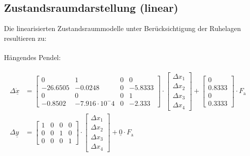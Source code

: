 \subsection{Zustandsraumdarstellung (linear)}

Die linearisierten Zustandsraummodelle unter Berücksichtigung der Ruhelagen resultieren zu:\\\\
Hängendes Pendel:

\begin{align}\label{eq:Gleichung32}
    \begin{split}
        \Delta{\dot{\underline{x}}}&=
        \begin{bmatrix}
            0 & 1 & 0 & 0 \\
            -26.6505 & -0.0248 & 0 & -5.8333 \\
            0 & 0 & 0 & 1 \\
            -0.8502 & -7.916\cdot10^-4 & 0 & -2.333
        \end{bmatrix}\cdot
        \begin{bmatrix}
            \Delta{x_{\mathrm{1}}} \\ \Delta{x_{\mathrm{2}}} \\ \Delta{x_{\mathrm{3}}} \\ \Delta{x_{\mathrm{4}}}
        \end{bmatrix}+
        \begin{bmatrix}
            0 \\
            0.8333 \\
            0 \\
            0.3333
        \end{bmatrix}\cdot F_{\mathrm{a}}
        \\
        \Delta{\underline{y}} &=
        \begin{bmatrix}
            1 & 0 & 0 & 0 \\
            0 & 0 & 1 & 0 \\
            0 & 0 & 0 & 1
        \end{bmatrix}\cdot
        \begin{bmatrix}
            \Delta{x_{\mathrm{1}}}\\
            \Delta{x_{\mathrm{2}}}\\
            \Delta{x_{\mathrm{3}}}\\
            \Delta{x_{\mathrm{4}}}
        \end{bmatrix}+\underline{0}\cdot F_{\mathrm{a}}
    \end{split}
\end{align}

